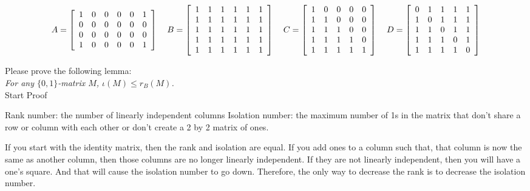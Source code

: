\documentclass[10pt, AMS Euler]{article}
\begin{document}
	$$A = \left[\begin{array}{cccccc} 1 & 0 & 0 & 0 & 0 & 1 \\ 
		0 & 0 & 0 & 0 & 0 & 0 \\
		0 & 0 & 0 & 0 & 0 & 0 \\
		1 & 0 & 0 & 0 & 0 & 1 \end{array} \right] \hspace{0.15in} 
	B = \left[\begin{array}{cccccc} 1 & 1 & 1 & 1 & 1 & 1 \\ 
		1 & 1 & 1 & 1 & 1 & 1 \\
		1 & 1 & 1 & 1 & 1 & 1 \\
		1 & 1 & 1 & 1 & 1 & 1 \\
		1 & 1 & 1 & 1 & 1 & 1 \end{array} \right] \hspace{0.15in} 
	C = \left[\begin{array}{ccccc} 1 & 0 & 0 & 0 & 0  \\ 
		1 & 1 & 0 & 0 & 0 \\
		1 & 1 & 1 & 0 & 0  \\
		1 & 1 & 1 & 1 & 0 \\
		1 & 1 & 1 & 1 & 1 \end{array} \right]\hspace{0.15in} 
	D = \left[\begin{array}{ccccc} 0 & 1 & 1 & 1 & 1  \\ 
		1 & 0 & 1 & 1 & 1 \\
		1 & 1 & 0 & 1 & 1  \\
		1 & 1 & 1 & 0 & 1 \\
		1 & 1 & 1 & 1 & 0 \end{array} \right]$$ 
	
	
	\noindent Please prove the following lemma: \\
	
	 \emph{For any $\{0,1\}$-matrix $M$, $\iota(M) \leq r_B(M)$.}\\

    Start Proof
    
    Rank number: the number of linearly independent columns
    Isolation number: the maximum number of 1s in the matrix that don't share a row or column with each other or don't create a 2 by 2 matrix of ones.
    
    If you start with the identity matrix, then the rank and isolation are equal. If you add ones to a column such that, that column is now the same as another column, then those columns are no longer linearly independent. If they are not linearly independent, then you will have a one's square. And that will cause the isolation number to go down. Therefore, the only way to decrease the rank is to decrease the isolation number. 
\end{document}
